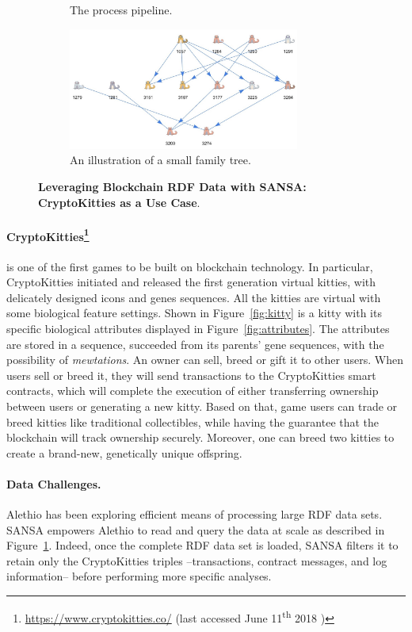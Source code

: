 \begin{figure}[t]
\begin{subfigure}[b]{0.5\textwidth}
\caption{The process pipeline.}
\label{fig:pipeline}
\end{subfigure}
\begin{subfigure}[b]{0.5\textwidth}
\centering
\includegraphics[height=4cm,width=\textwidth]{images/7_implemenation_and_usecases/incest-crop.jpeg}
\caption{An illustration of a small family tree.}
\label{fig:incest}
\end{subfigure}
\caption{\textbf{Leveraging Blockchain RDF Data with SANSA: CryptoKitties as a Use Case}.}
\label{fig:crypto-sansa}
\end{figure}

\paragraph*{CryptoKitties\footnote{\url{https://www.cryptokitties.co/} (last accessed June 11\textsuperscript{th} 2018 )}} is one of the first games to be built on blockchain technology.
In particular, CryptoKitties initiated and released the first generation virtual kitties, with delicately designed icons and genes sequences. 
All the kitties are virtual with some biological feature settings. 
Shown in Figure~\ref{fig:kitty} is a kitty with its specific biological attributes displayed in Figure~\ref{fig:attributes}. 
The attributes are stored in a sequence, succeeded from its parents' gene sequences, with the possibility of \textit{mewtations}.
An owner can sell, breed or gift it to other users.
When users sell or breed it, they will send transactions to the CryptoKitties smart contracts, which will complete the execution of either transferring ownership between users or generating a new kitty.
Based on that, game users can trade or breed kitties like traditional collectibles, while having the guarantee that the blockchain will track ownership securely. 
Moreover, one can breed two kitties to create a brand-new, genetically unique offspring.

\paragraph*{Data Challenges.}
Alethio has been exploring efficient means of processing large \gls{RDF} data sets. 
SANSA empowers Alethio to read and query the data at scale as described in Figure~\ref{fig:pipeline}. 
Indeed, once the complete \gls{RDF} data set is loaded, SANSA filters it to retain only the CryptoKitties triples --transactions, contract messages, and log information-- before performing more specific analyses.

